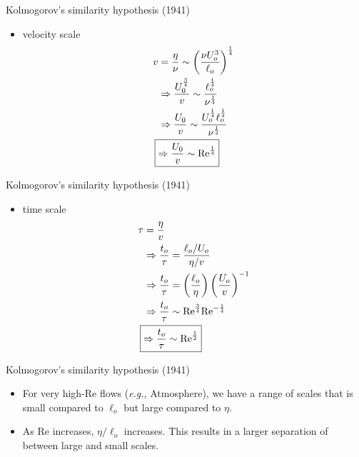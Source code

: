 
\begin{frame}{Kolmogorov's similarity hypothesis (1941)}
\begin{itemize}
	\item velocity scale
	\begin{align*} 
		v &= \frac{\eta}{\nu} \sim \left( \frac{\nu U_o^3}{\ell_o}\right)^{\frac{1}{4}}\\
		&\Rightarrow \frac{U_0^{\frac{3}{4}}}{v} \sim \frac{\ell_o^{\frac{1}{4}}}{\nu^{\frac{1}{4}}}\\
		&\Rightarrow \frac{U_0}{v} \sim \frac{U_o^{\frac{1}{4}}\ell_o^{\frac{1}{4}}}{\nu^{\frac{1}{4}}}\\
		\Aboxed{ &\Rightarrow \frac{U_0}{v} \sim \text{Re}^{\frac{1}{4}}}
	\end{align*}
\end{itemize}
\end{frame}


\begin{frame}{Kolmogorov's similarity hypothesis (1941)}
\begin{itemize}
	\item time scale
	\begin{align*} 
		\tau &= \frac{\eta}{v}\\
		&\Rightarrow \frac{t_o}{\tau} = \frac{\ell_o/U_o}{\eta/v}\\
		&\Rightarrow \frac{t_o}{\tau} = \left(\frac{\ell_o}{\eta}\right) \left(\frac{U_o}{v}\right)^{-1}\\
		&\Rightarrow \frac{t_o}{\tau} \sim \text{Re}^{\frac{3}{4}} \text{Re}^{-\frac{1}{4}}\\
		\Aboxed{&\Rightarrow \frac{t_o}{\tau} \sim \text{Re}^{\frac{1}{2}}}
	\end{align*}
\end{itemize}
\end{frame}


\begin{frame}{Kolmogorov's similarity hypothesis (1941)}
\begin{itemize}
	\item For very high-Re flows (\textit{e.g.}, Atmosphere), we have a range of scales that is small compared to $\ell_o$ but large compared to $\eta$.
	\item As Re increases, $\eta/\ell_o$ increases. This results in a larger separation of between large and small scales.
\end{itemize}
\end{frame}


